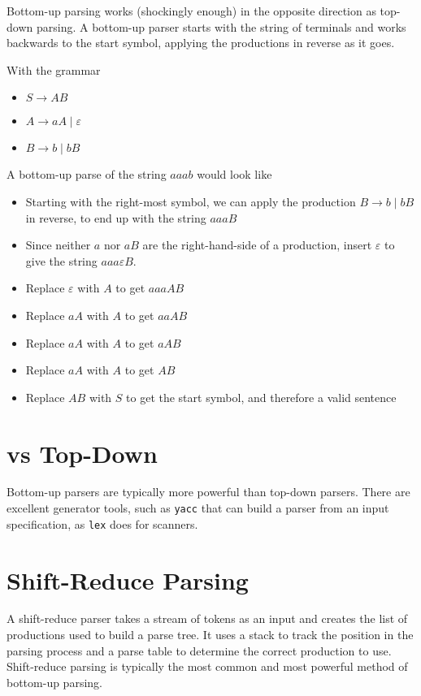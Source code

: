 
Bottom-up parsing works (shockingly enough) in the opposite direction as top-down parsing. A bottom-up parser starts
 with the string of terminals and works backwards to the start symbol, applying the productions in reverse as it goes.

With the grammar
\begin{itemize}
  \item $S \rightarrow AB$
  \item $A \rightarrow aA \mid \varepsilon$
  \item $B \rightarrow b \mid bB$
\end{itemize}
A bottom-up parse of the string $aaab$ would look like
\begin{itemize}
  \item Starting with the right-most symbol, we can apply the production $B \rightarrow b \mid bB$ in reverse, to end up
   with the string $aaaB$
  \item Since neither $a$ nor $aB$ are the right-hand-side of a production, insert $\varepsilon$ to give the string
   $aaa{\varepsilon}B$.
  \item Replace $\varepsilon$ with $A$ to get $aaaAB$
  \item Replace $aA$ with $A$ to get $aaAB$
  \item Replace $aA$ with $A$ to get $aAB$
  \item Replace $aA$ with $A$ to get $AB$
  \item Replace $AB$ with $S$ to get the start symbol, and therefore a valid sentence
\end{itemize}

\section*{vs Top-Down}

Bottom-up parsers are typically more powerful than top-down parsers. There are excellent generator tools, such as
 \verb`yacc` that can build a parser from an input specification, as \verb`lex` does for scanners.

\section*{Shift-Reduce Parsing}

A shift-reduce parser takes a stream of tokens as an input and creates the list of productions used to build a parse
 tree. It uses a stack to track the position in the parsing process and a parse table to determine the correct production
 to use. Shift-reduce parsing is typically the most common and most powerful method of bottom-up parsing.

